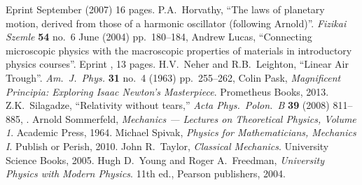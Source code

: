 \begin{thebibliography}{99}
  Eprint  September (2007) 16 pages.
  P.A.~Horvathy,
  ``The laws of planetary motion, derived from those of a harmonic oscillator (following Arnold)''.
  \emph{Fizikai Szemle} \textbf{54} no.~6 June (2004) pp.~180--184,
  Andrew Lucas,
  ``Connecting microscopic physics with the macroscopic properties of materials in introductory physics courses''.
  Eprint , 13 pages.
  H.V.~Neher and R.B.~Leighton,
  ``Linear Air Trough''.
  \emph{Am.\ J.\ Phys.} {\bf 31} no.~4 (1963) pp.~255--262,
  Colin Pask,
  \emph{Magnificent Principia: Exploring Isaac Newton's Masterpiece}.
  Prometheus Books, 2013.
  Z.K.~Silagadze,
  ``Relativity without tears,''
  \emph{Acta Phys.~Polon.~B} {\bf 39} (2008) 811--885,
  .
  Arnold Sommerfeld,
  \emph{Mechanics --- Lectures on Theoretical Physics, Volume 1}.
  Academic Press, 1964.
  Michael Spivak,
  \emph{Physics for Mathematicians, Mechanics I}.
  Publish or Perish, 2010.
  John R.~Taylor,
  \emph{Classical Mechanics}.
  University Science Books, 2005.
  Hugh D.~Young and Roger A.~Freedman,
  \emph{University Physics with Modern Physics}.
  11th ed., Pearson publishers, 2004.
\end{thebibliography}
